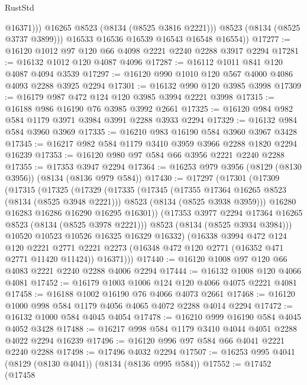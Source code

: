 \begin{lexlean}{RustStd}
\begin{coremodule}
                  @16371)))
            @16265
            @8523
            (@8134 (@8525 @3816 @2221)))
          @8523
          (@8134 (@8525 @3737 @3899)))
        @16533
        @16536
        @16539
        @16543
        @16548
        @16554))
@17277 := @16120 @1012 @97 @120 @66 @4098 @2221 @2240 @2288 @3917 @2294
@17281 := @16132 @1012 @120 @4087 @4096
@17287 := @16112 @1011 @841 @120 @4087 @4094 @3539
@17297 := @16120 @990 @1010 @120 @567 @4000 @4086 @4093 @2288 @3925 @2294
@17301 := @16132 @990 @120 @3985 @3998
@17309 := @16179 @987 @472 @124 @120 @3985 @3994 @2221 @3998
@17315 := @16188 @986 @16190 @76 @3985 @3992 @2661
@17325 := @16120 @984 @982 @584 @1179 @3971 @3984 @3991 @2288 @3933 @2294
@17329 := @16132 @984 @584 @3960 @3969
@17335 := @16210 @983 @16190 @584 @3960 @3967 @3428
@17345 := @16217 @982 @584 @1179 @3410 @3959 @3966 @2288 @1820 @2294 @16239
@17353 := @16120 @980 @97 @584 @66 @3956 @2221 @2240 @2288
@17355 := @17353 @3947 @2294
@17364 := @16253 @979 @3956 (@8129 (@8130 @3956)) (@8134 (@8136 @979 @584))
@17430 := @17297
    (@17301
      (@17309
        (@17315
          (@17325
            (@17329
              (@17335
                (@17345
                  (@17355 @17364 @16265 @8523 (@8134 (@8525 @3948 @2221)))
                  @8523
                  (@8134 (@8525 @3938 @3959)))
                @16280
                @16283
                @16286
                @16290
                @16295
                @16301))
            (@17353 @3977 @2294 @17364 @16265 @8523 (@8134 (@8525 @3978 @2221)))
            @8523
            (@8134 (@8525 @3934 @3984)))
          @10520
          @10523
          @10526
          @16325
          @16329
          @16332)
        (@16338
          @3994
          @472
          @124
          @120
          @2221
          @2771
          @2221
          @2273
          (@16348 @472 @120 @2771 (@16352 @471 @2771 @11420 @11424))
          @16371)))
@17440 := @16120 @1008 @97 @120 @66 @4083 @2221 @2240 @2288 @4006 @2294
@17444 := @16132 @1008 @120 @4066 @4081
@17452 := @16179 @1003 @1006 @124 @120 @4066 @4075 @2221 @4081
@17458 := @16188 @1002 @16190 @76 @4066 @4073 @2661
@17468 := @16120 @1000 @998 @584 @1179 @4056 @4065 @4072 @2288 @4014 @2294
@17472 := @16132 @1000 @584 @4045 @4054
@17478 := @16210 @999 @16190 @584 @4045 @4052 @3428
@17488 := @16217 @998 @584 @1179 @3410 @4044 @4051 @2288 @4022 @2294 @16239
@17496 := @16120 @996 @97 @584 @66 @4041 @2221 @2240 @2288
@17498 := @17496 @4032 @2294
@17507 := @16253 @995 @4041 (@8129 (@8130 @4041)) (@8134 (@8136 @995 @584))
@17552 := @17452
    (@17458

\end{coremodule}
\end{lexlean}
